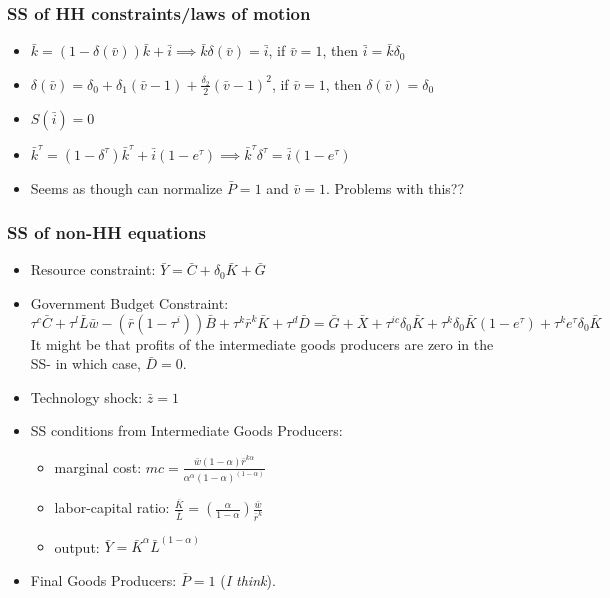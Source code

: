 \documentclass[article,11pt,letterpaper,fleqn]{article}
\theoremstyle{definition}
\numberwithin{equation}{section}
\begin{document}
\subsubsection{SS of HH constraints/laws of motion}
\begin{itemize}
\item $\bar{k}=(1-\delta(\bar{v}))\bar{k}+\bar{i}\implies \bar{k}\delta(\bar{v})=\bar{i}$, if $\bar{v}=1$, then $\bar{i}=\bar{k}\delta_{0}$
\item $\delta(\bar{v}) = \delta_{0}+\delta_{1}(\bar{v}-1)+\frac{\delta_{2}}{2}(\bar{v}-1)^{2}$, if $\bar{v}=1$, then $\delta(\bar{v})=\delta_{0}$
\item $S(\bar{i}) = 0$
\item $\bar{k}^{\tau} = (1-\delta^{\tau})\bar{k}^{\tau}+\bar{i}(1-e^{\tau}) \implies \bar{k}^{\tau}\delta^{\tau}=\bar{i}(1-e^{\tau})$
\item Seems as though can normalize $\bar{P}=1$ and $\bar{v}=1$.  Problems with this??
\end{itemize}


\subsubsection{SS of non-HH equations}

\begin{itemize}
\item Resource constraint: $\bar{Y} = \bar{C}+\delta_{0}\bar{K}+\bar{G}$
\item Government Budget Constraint: $\tau^{c}\bar{C} + \tau^{l}\bar{L}\bar{w} - (\bar{r}(1-\tau^{i}))\bar{B} + \tau^{k}\bar{r}^{k}\bar{K} + \tau^{d}\bar{D} = \bar{G} + \bar{X} + \tau^{ic}\delta_{0}\bar{K} + \tau^{k}\delta_{0}\bar{K}(1-e^{\tau}) + \tau^{k}e^{\tau}\delta_{0}\bar{K} $  It might be that profits of the intermediate goods producers are zero in the SS- in which case, $\bar{D}=0$.
\item Technology shock: $\bar{z} = 1$
\item SS conditions from Intermediate Goods Producers:
	\begin{itemize}
	\item marginal cost: $ mc = \frac{\bar{w}(1-\alpha)\bar{r}^{k \alpha}}{\alpha^{\alpha}(1-\alpha)^{(1-\alpha)}}$
	\item labor-capital ratio: $\frac{\bar{K}}{\bar{L}}=\left(\frac{\alpha}{1-\alpha}\right)\frac{\bar{w}}{\bar{r}^{k}}$
	\item output: $\bar{Y} = \bar{K}^{\alpha}\bar{L}^{(1-\alpha)}$
	\end{itemize}
	\item Final Goods Producers: $\bar{P}=1$ (\emph{I think}).
\end{itemize}
\end{document}
